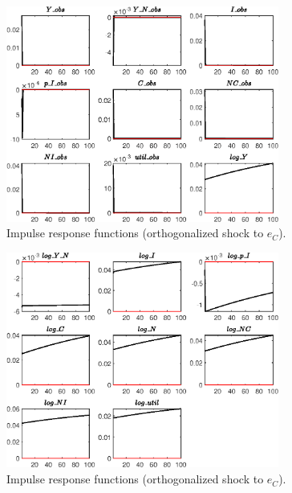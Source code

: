 \begin{figure}[H]
\centering 
\includegraphics[width=0.80\textwidth]{BRS_imp_mobility_alt/graphs/BRS_imp_mobility_alt_IRF_e_C1}
\caption{Impulse response functions (orthogonalized shock to ${e_C}$).}\label{Fig:IRF:e_C:1}
\end{figure}
 
\begin{figure}[H]
\centering 
\includegraphics[width=0.80\textwidth]{BRS_imp_mobility_alt/graphs/BRS_imp_mobility_alt_IRF_e_C2}
\caption{Impulse response functions (orthogonalized shock to ${e_C}$).}\label{Fig:IRF:e_C:2}
\end{figure}
 
 
